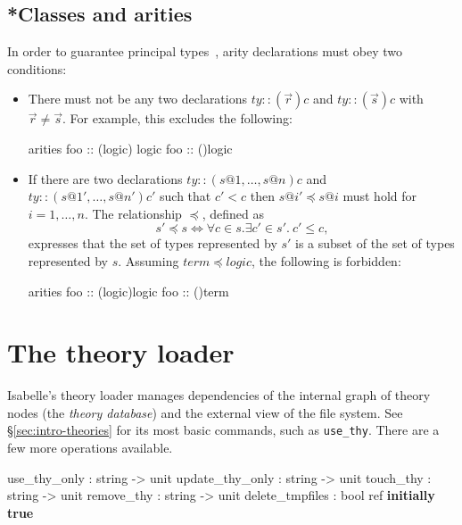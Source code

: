 \subsection{*Classes and arities}

In order to guarantee principal types~\cite{nipkow-prehofer},
arity declarations must obey two conditions:
\begin{itemize}
\item There must not be any two declarations $ty :: (\vec{r})c$ and
  $ty :: (\vec{s})c$ with $\vec{r} \neq \vec{s}$.  For example, this
  excludes the following:
\begin{ttbox}
arities
  foo :: ({\ttlbrace}logic{\ttrbrace}) logic
  foo :: ({\ttlbrace}{\ttrbrace})logic
\end{ttbox}

\item If there are two declarations $ty :: (s@1,\dots,s@n)c$ and $ty ::
  (s@1',\dots,s@n')c'$ such that $c' < c$ then $s@i' \preceq s@i$ must hold
  for $i=1,\dots,n$.  The relationship $\preceq$, defined as
\[ s' \preceq s \iff \forall c\in s. \exists c'\in s'.~ c'\le c, \]
expresses that the set of types represented by $s'$ is a subset of the
set of types represented by $s$.  Assuming $term \preceq logic$, the
following is forbidden:
\begin{ttbox}
arities
  foo :: ({\ttlbrace}logic{\ttrbrace})logic
  foo :: ({\ttlbrace}{\ttrbrace})term
\end{ttbox}

\end{itemize}


\section{The theory loader}\label{sec:more-theories}

Isabelle's theory loader manages dependencies of the internal graph of theory
nodes (the \emph{theory database}) and the external view of the file system.
See \S\ref{sec:intro-theories} for its most basic commands, such as
\texttt{use_thy}.  There are a few more operations available.

\begin{ttbox}
use_thy_only    : string -> unit
update_thy_only : string -> unit
touch_thy       : string -> unit
remove_thy      : string -> unit
delete_tmpfiles : bool ref \hfill{\bf initially true}
\end{ttbox}

